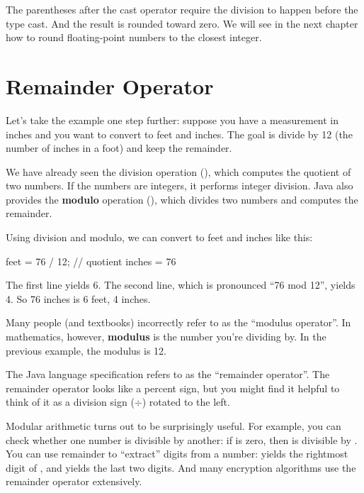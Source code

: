 {{The parentheses after the cast operator require the division to happen before the type cast.
And the result is rounded toward zero.
We will see in the next chapter how to round floating-point numbers to the closest integer.


\section{Remainder Operator}

Let's take the example one step further: suppose you have a measurement in inches and you want to convert to feet and inches.
The goal is divide by 12 (the number of inches in a foot) and keep the remainder.


We have already seen the division operation (\java{/}), which computes the quotient of two numbers.
If the numbers are integers, it performs integer division.
Java also provides the {\bf modulo} operation (\java{\%}), which divides two numbers and computes the remainder.

Using division and modulo, we can convert to feet and inches like this:

\begin{code}
feet = 76 / 12;    // quotient
inches = 76 %
\end{code}

The first line yields 6.
The second line, which is pronounced ``76 mod 12'', yields 4.
So 76 inches is 6 feet, 4 inches.


Many people (and textbooks) incorrectly refer to \java{\%} as the ``modulus operator''.
In mathematics, however, {\bf modulus} is the number you're dividing by.
In the previous example, the modulus is 12.

The Java language specification refers to  \java{\%} as the ``remainder operator''.
The remainder operator looks like a percent sign, but you might find it helpful to think of it as a division sign ($\div$) rotated to the left.



Modular arithmetic turns out to be surprisingly useful.
For example, you can check whether one number is divisible by another: if  is zero, then  is divisible by .
You can use remainder to ``extract'' digits from a number:  yields the rightmost digit of , and  yields the last two digits.
And many encryption algorithms use the remainder operator extensively.

}}
